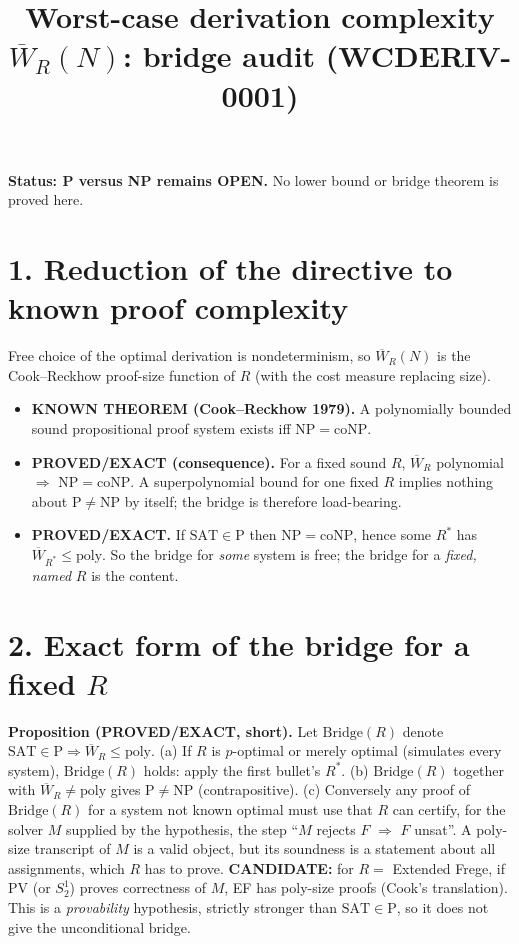 \documentclass{article}
\begin{document}
\title{Worst-case derivation complexity $\overline W_R(N)$: bridge audit (WCDERIV-0001)}
\maketitle
\noindent\textbf{Status: P versus NP remains OPEN.} No lower bound or bridge theorem is proved here.

\section*{1. Reduction of the directive to known proof complexity}
Free choice of the optimal derivation is nondeterminism, so $\overline W_R(N)$ is the Cook--Reckhow proof-size function of $R$ (with the cost measure replacing size).
\begin{itemize}
\item \textbf{KNOWN THEOREM (Cook--Reckhow 1979).} A polynomially bounded sound propositional proof system exists iff $\mathrm{NP}=\mathrm{coNP}$.
\item \textbf{PROVED/EXACT (consequence).} For a fixed sound $R$, $\overline W_R$ polynomial $\Rightarrow$ $\mathrm{NP}=\mathrm{coNP}$. A superpolynomial bound for one fixed $R$ implies nothing about $\mathrm{P}\ne\mathrm{NP}$ by itself; the bridge is therefore load-bearing.
\item \textbf{PROVED/EXACT.} If $\mathrm{SAT}\in\mathrm{P}$ then $\mathrm{NP}=\mathrm{coNP}$, hence some $R^\ast$ has $\overline W_{R^\ast}\le \mathrm{poly}$. So the bridge for \emph{some} system is free; the bridge for a \emph{fixed, named} $R$ is the content.
\end{itemize}

\section*{2. Exact form of the bridge for a fixed $R$}
\textbf{Proposition (PROVED/EXACT, short).} Let $\mathrm{Bridge}(R)$ denote $\mathrm{SAT}\in\mathrm P\Rightarrow\overline W_R\le\mathrm{poly}$.
(a) If $R$ is $p$-optimal or merely optimal (simulates every system), $\mathrm{Bridge}(R)$ holds: apply the first bullet's $R^\ast$.
(b) $\mathrm{Bridge}(R)$ together with $\overline W_R\ne\mathrm{poly}$ gives $\mathrm P\ne\mathrm{NP}$ (contrapositive).
(c) Conversely any proof of $\mathrm{Bridge}(R)$ for a system not known optimal must use that $R$ can certify, for the solver $M$ supplied by the hypothesis, the step ``$M$ rejects $F$ $\Rightarrow$ $F$ unsat''. A poly-size transcript of $M$ is a valid object, but its soundness is a statement about all assignments, which $R$ has to prove. \textbf{CANDIDATE:} for $R=$ Extended Frege, if PV (or $S^1_2$) proves correctness of $M$, EF has poly-size proofs (Cook's translation). This is a \emph{provability} hypothesis, strictly stronger than $\mathrm{SAT}\in\mathrm P$, so it does not give the unconditional bridge.
\end{document}
